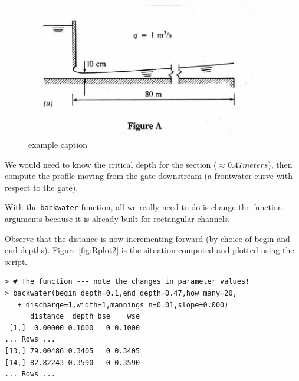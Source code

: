 \begin{figure}[h!] %
   \centering
   \includegraphics[width=4in]{./13-SteadyWSP/bw_curve2.jpg} 
   \caption{example caption}
   \label{fig:example2}
\end{figure}

We would need to know the critical depth for the section ($\approx 0.47 meters$), then compute the profile moving from the gate downstream (a frontwater curve with respect to the gate).  

With the \texttt{backwater} function, all we really need to do is change the function arguments because it is already built for rectangular channels.  

Observe that the distance is now incrementing forward (by choice of begin and end depths).  Figure \ref{fig:Rplot2} is the situation computed and plotted using the script.

\begin{lstlisting}[caption=R Console Output when script is run \\ , label=lst:frontwaterConsole]
> # The function --- note the changes in parameter values!
> backwater(begin_depth=0.1,end_depth=0.47,how_many=20,
   + discharge=1,width=1,mannings_n=0.01,slope=0.000)
      distance  depth bse    wse
 [1,]  0.00000 0.1000   0 0.1000
... Rows ...
[13,] 79.00486 0.3405   0 0.3405
[14,] 82.82243 0.3590   0 0.3590
... Rows ...
\end{lstlisting} 


